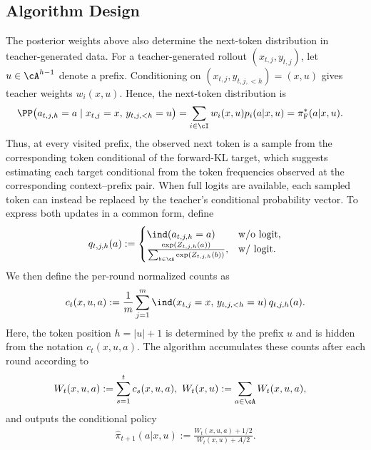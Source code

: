 \documentclass[11pt]{article}
\newcommand{\pif}{\pi_{\mathrm{F}}}
\begin{document}
\subsection{Algorithm Design}
The posterior weights above also determine the next-token distribution in teacher-generated data. For a teacher-generated rollout $(x_{t,j},y_{t,j})$, let $u\in\cA^{h-1}$ denote a prefix. Conditioning on $(x_{t,j},y_{t,j,<h})=(x,u)$ gives teacher weights $w_i(x,u)$. Hence, the next-token distribution is
\begin{align*}
    \PP\bigl(
        a_{t,j,h}=a
        \mid
        x_{t,j}=x,\,
        y_{t,j,<h}=u
    \bigr)
    &=
    \sum_{i\in\cI}
    w_i(x,u)p_i(a|x,u)=
    \pif^*(a|x,u).
\end{align*}
Thus, at every visited prefix, the observed next token is a sample from the corresponding token conditional of the forward-KL target, which suggests estimating each target conditional from the token frequencies observed at the corresponding context--prefix pair. When full logits are available, each sampled token can instead be replaced by the teacher's conditional probability vector. To express both updates in a common form, define
\begin{align}
\notag
    q_{t,j,h}(a):=
    \begin{cases}
        \ind(a_{t,j,h}=a)
        & \mathrm{w/o \ logit},\\
        \frac{\exp(Z_{t,j,h}(a))}
             {\sum_{b\in\cA}\exp(Z_{t,j,h}(b))},
        & \mathrm{w/ \ logit}.
    \end{cases}
\end{align}
We then define the per-round normalized counts as
\begin{align}
\label{eq:fkl-count}
    c_t(x,u,a)
    :=
    \frac{1}{m}\sum_{j=1}^m
    \ind(x_{t,j}=x,\,y_{t,j,<h}=u)\,
    q_{t,j,h}(a).
\end{align}
Here, the token position $h=|u|+1$ is determined by the prefix $u$ and is hidden from the notation $c_t(x,u,a)$. The algorithm accumulates these counts after each round according to
\begin{align*}
    W_t(x,u,a)
    &:=
    \sum_{s=1}^t c_s(x,u,a), \
    W_t(x,u)
    :=
    \sum_{a\in\cA}W_t(x,u,a),
\end{align*}
and outputs the conditional policy
\begin{align}
    \hat\pi_{t+1}(a|x,u)
    :=
    \frac{W_t(x,u,a)+1/2}
         {W_t(x,u)+A/2}.
    \label{eq:off-policy-smoothed-estimator}
\end{align}
\end{document}
